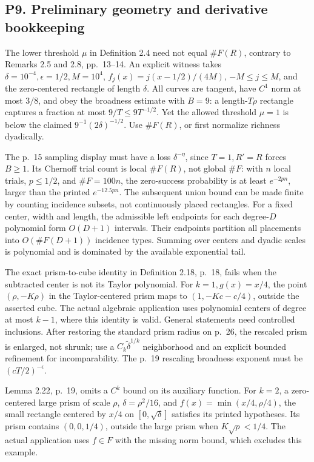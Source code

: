 \documentclass[10pt]{article}
\begin{document}
\subsection*{P9. Preliminary geometry and derivative bookkeeping}
The lower threshold \(\mu\) in Definition 2.4 need not equal \(\#F(R)\), contrary to Remarks 2.5 and 2.8, pp. 13–14. An explicit witness takes \(\delta=10^{-4},\epsilon=1/2,M=10^4\), \(f_j(x)=j(x-1/2)/(4M)\), \(-M\le j\le M\), and the zero-centered rectangle of length \(\delta\). All curves are tangent, have \(C^1\) norm at most \(3/8\), and obey the broadness estimate with \(B=9\): a length-\(T\rho\) rectangle captures a fraction at most \(9/T\le9T^{-1/2}\). Yet the allowed threshold \(\mu=1\) is below the claimed \(9^{-1}(2\delta)^{-1/2}\). Use \(\#F(R)\), or first normalize richness dyadically.\par
The p. 15 sampling display must have a loss \(\delta^{-\eta}\), since \(T=1,R'=R\) forces \(B\ge1\). Its Chernoff trial count is local \(\#F(R)\), not global \(\#F\): with \(n\) local trials, \(p\le1/2\), and \(\#F=100n\), the zero-success probability is at least \(e^{-2pn}\), larger than the printed \(e^{-12.5pn}\). The subsequent union bound can be made finite by counting incidence subsets, not continuously placed rectangles. For a fixed center, width and length, the admissible left endpoints for each degree-\(D\) polynomial form \(O(D+1)\) intervals. Their endpoints partition all placements into \(O(\#F(D+1))\) incidence types. Summing over centers and dyadic scales is polynomial and is dominated by the available exponential tail.\par
The exact prism-to-cube identity in Definition 2.18, p. 18, fails when the subtracted center is not its Taylor polynomial. For \(k=1,g(x)=x/4\), the point \((\rho,-K\rho)\) in the Taylor-centered prism maps to \((1,-Kc-c/4)\), outside the asserted cube. The actual algebraic application uses polynomial centers of degree at most \(k-1\), where this identity is valid. General statements need controlled inclusions. After restoring the standard prism radius on p. 26, the rescaled prism is enlarged, not shrunk; use a \(C_k\widetilde\delta^{1/k}\) neighborhood and an explicit bounded refinement for incomparability. The p. 19 rescaling broadness exponent must be \((cT/2)^{-\epsilon}\).\par
Lemma 2.22, p. 19, omits a \(C^k\) bound on its auxiliary function. For \(k=2\), a zero-centered large prism of scale \(\rho\), \(\delta=\rho^2/16\), and \(f(x)=\min(x/4,\rho/4)\), the small rectangle centered by \(x/4\) on \([0,\sqrt\delta]\) satisfies its printed hypotheses. Its prism contains \((0,0,1/4)\), outside the large prism when \(K\sqrt\rho<1/4\). The actual application uses \(f\in F\) with the missing norm bound, which excludes this example.\par
\end{document}
